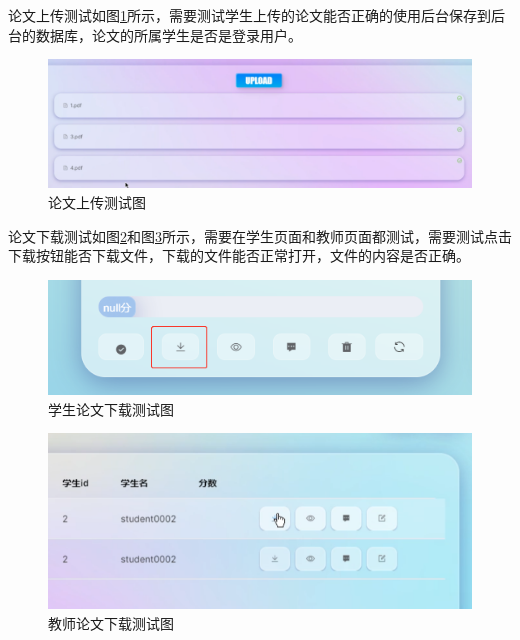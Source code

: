 论文上传测试如图\ref{upload-test}所示，需要测试学生上传的论文能否正确的使用后台保存到后台的数据库，论文的所属学生是否是登录用户。

\begin{figure}[htbp]
  \centering
  \includegraphics[scale = 0.5]{out/figure/测试/upload-test.png}
  \caption{\song\wuhao 论文上传测试图}
  \label{upload-test}
\end{figure}

论文下载测试如图\ref{download-student-test}和图\ref{download-teacher-test}所示，需要在学生页面和教师页面都测试，需要测试点击下载按钮能否下载文件，下载的文件能否正常打开，文件的内容是否正确。

\begin{figure}[htbp]
  \centering
  \includegraphics[scale = 0.6]{out/figure/测试/download-student-test.png}
  \caption{\song\wuhao 学生论文下载测试图}
  \label{download-student-test}
\end{figure}

\begin{figure}[htbp]
  \centering
  \includegraphics[scale = 0.6]{out/figure/测试/download-teacher-test.png}
  \caption{\song\wuhao 教师论文下载测试图}
  \label{download-teacher-test}
\end{figure}

